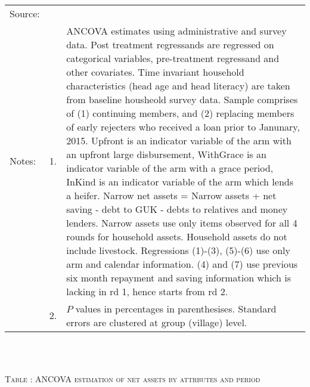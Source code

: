 \begin{minipage}[t]{14cm}
\\
\renewcommand{\arraystretch}{.8}
\setlength{\tabcolsep}{1pt} \begin{tabular}{>{\hfill\scriptsize}p{1cm}<{}>{\hfill\scriptsize}p{.25cm}<{}>{\scriptsize}p{12cm}<{\hfill}} 
Source:& \multicolumn{2}{l}{\scriptsize Estimated with GUK administrative and survey data.}\\
Notes: & 1. & ANCOVA estimates using administrative and survey data. Post treatment regressands are regressed on categorical variables, pre-treatment regressand and other covariates. Time invariant household characteristics (head age and head literacy) are taken from baseline housheold survey data. Sample comprises of (1) continuing members, and (2) replacing members of early rejecters who received a loan prior to Janunary, 2015.  \textsf{Upfront} is an indicator variable of the arm with an upfront large disbursement, \textsf{WithGrace} is an indicator variable of the arm with a grace period, \textsf{InKind} is an indicator variable of the arm which lends a heifer. Narrow net assets = Narrow assets + net saving - debt to GUK - debts to relatives and money lenders. Narrow assets use only items observed for all 4 rounds for household assets. Household assets do not include livestock. Regressions (1)-(3), (5)-(6) use only arm and calendar information. (4) and (7) use previous six month repayment and saving information which is lacking in rd 1, hence starts from rd 2.\\
& 2. &  $P$ values in percentages in parenthesises. Standard errors are clustered at group (village) level. %
 \end{tabular}
\end{minipage} \\\\\hspace{-1cm}\begin{minipage}[t]{14cm} \hfil\textsc{\normalsize Table \thetable: ANCOVA estimation of net assets by attrbutes and period\label{tab ANCOVA net assets timevarying attributes}}\\ \setlength{\tabcolsep}{1pt}
  \setlength{\baselineskip}{8pt}

\end{minipage}
